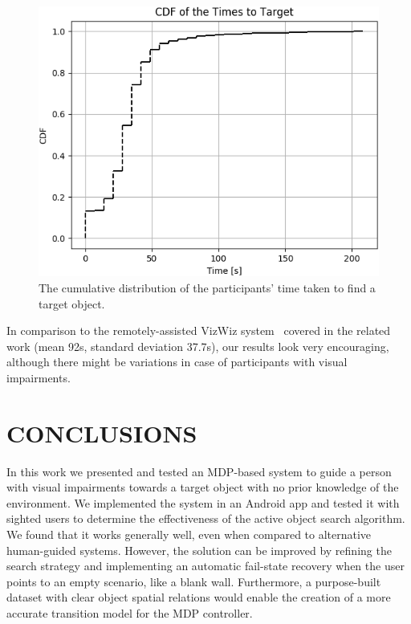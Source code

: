 \documentclass[a4paper, twoside]{article}
\begin{document}
\begin{figure}
  \centering
  \includegraphics[width=\columnwidth]{figures/cdf_total_time.png}
  \caption{The cumulative distribution of the participants' time taken to find a target object. }\label{fig:time-participants}
\end{figure}

In comparison to the remotely-assisted VizWiz system~\cite{bigham2010vizwiz} covered in the related work (mean 92s, standard deviation 37.7s), our results look very encouraging, although there might be variations in case of participants with visual impairments.

\section{\uppercase{Conclusions}}\label{sec:conclusion}

\noindent In this work we presented and tested an MDP-based system to guide a person with visual impairments towards a target object with no prior knowledge of the environment. We implemented the system in an Android app and tested it with sighted users to determine the effectiveness of the active object search algorithm. We found that it works generally well, even when compared to alternative human-guided systems. However, the solution can be improved by refining the search strategy and implementing an automatic fail-state recovery when the user points to an empty scenario, like a blank wall. Furthermore, a purpose-built dataset with clear object spatial relations would enable the creation of a more accurate transition model for the MDP controller.
\end{document}
